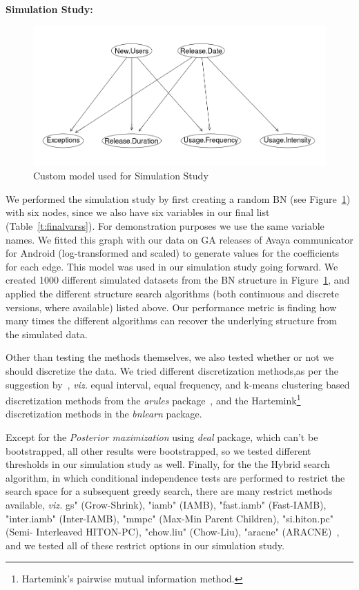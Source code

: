 \documentclass[smallcondensed]{svjour3}     %
\begin{document}
\noindent\\
\textbf{Simulation Study:}\\
\begin{figure}
\centering
\includegraphics[width=0.65\linewidth]{custom}
\caption{Custom model used for Simulation Study}
\label{fig:theory}
\vspace{-15pt}
\end{figure}
We performed the simulation study by first creating 
a random BN (see Figure~\ref{fig:theory}) with 
six nodes, since we also have six variables in our final list (Table~\ref{t:finalvarss}).
For demonstration purposes  we use the same variable names. 
We fitted this graph with our data on GA releases of Avaya communicator for Android
 (log-transformed and scaled) to generate values for the coefficients 
for each edge. This model was used in our simulation study going forward.
We created 1000 different simulated datasets from the BN structure in Figure~\ref{fig:theory},
and applied the different structure search algorithms 
(both continuous and discrete versions, where available) listed above. Our performance metric
is finding how many times the different algorithms can recover the 
underlying structure from the simulated data. 

Other than testing the methods  themselves, we also tested whether or not we should 
discretize the data. We tried different discretization methods,as per the suggestion by~\cite{garcia2013survey}, \textit{viz.} 
equal interval, equal frequency, and
k-means clustering based discretization methods from the
\textit{arules} package~\cite{arulesR}, and the 
Hartemink\footnote{Hartemink's pairwise mutual information 
method\cite{hartemink2001principled}.} discretization methods 
in the \textit{bnlearn} package.

Except for the \textit{Posterior maximization} using \textit{deal} package, which can't be bootstrapped, 
all other results were bootstrapped, so we tested different thresholds in our 
simulation study as well. Finally, for the the Hybrid search algorithm, in which
conditional independence tests are performed to restrict
the search space for a subsequent greedy search, there are many restrict methods
available, \textit{viz.} gs" (Grow-Shrink), "iamb" (IAMB), "fast.iamb" (Fast-IAMB), "inter.iamb" (Inter-IAMB), "mmpc" (Max-Min Parent Children), "si.hiton.pc" (Semi- Interleaved HITON-PC), "chow.liu" (Chow-Liu), "aracne" (ARACNE)~\cite{bnlearnR}, and we tested all of these restrict options 
in our simulation study. 
\end{document}
